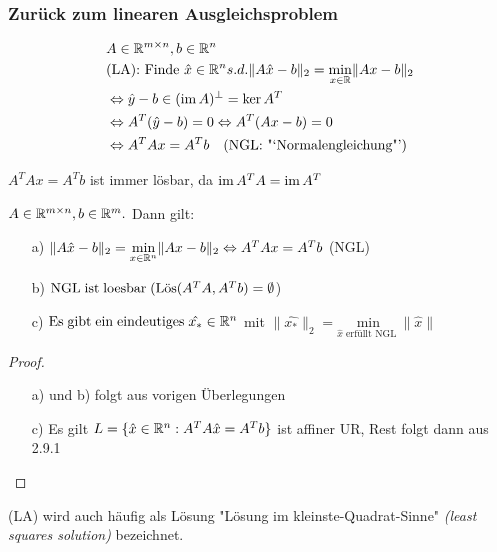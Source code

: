 \subsubsection{Zurück zum linearen Ausgleichsproblem}
\begin{align*}
&A \in \mathbb R^{m \times n}, b \in \mathbb R^n\\
&\text{(LA): Finde } \hat{x} \in \mathbb R^n s.d. \|A\hat{x}-b\|_2 = \underset{x \in \mathbb R}{\mathrm{min}}\|Ax-b\|_2\\
&\Leftrightarrow \hat{y}-b \in (\operatorname*{\mathrm{im}} A)^{\perp} = \ker A^T\\
&\Leftrightarrow A^T(\hat{y}-b)=0 \Leftrightarrow A^T(Ax-b)=0\\
&\Leftrightarrow A^TAx=A^Tb \quad \text{(NGL:  "`Normalengleichung"')}
\end{align*}
\begin{Bemerkung}
$A^TAx=A^Tb$ ist immer lösbar, da $\operatorname*{\mathrm{im}} A^TA=\operatorname*{\mathrm{im}} A^T$
\end{Bemerkung}
\begin{Satz}
$A \in \mathbb R^{m \times n}, b \in \mathbb R^m.$ Dann gilt:
\begin{itemize}
\item[a)]$\|A\hat{x}-b\|_2= \underset{x \in \mathbb R^n}{\mathrm{min}}\|Ax-b\|_2 \Leftrightarrow A^TAx=A^Tb$ (NGL)
\item[b)] $\mathrm{NGL\;ist\;loesbar\;} (\mathrm{L\ddot{o}s}(A^TA,A^Tb) = \emptyset$)
\item[c)] $\mathrm{Es\;gibt\;ein\;eindeutiges\;} \hat{x_{*}} \in \mathbb R^n$ mit $ \|\hat{x_{*}}\|_2 = \underset{\hat{x} \text{ erfüllt NGL }}{\mathrm{min}}\|\hat{x}\|$
\end{itemize}
\end{Satz}
\begin{proof}
	\begin{itemize}
		\item[a) und b)] folgt aus vorigen Überlegungen
		\item[c)] Es gilt $L=\{\hat{x}\in \mathbb R^n:A^TA\hat{x}=A^Tb\}$ ist affiner UR, Rest folgt dann aus 2.9.1
	\end{itemize}
\end{proof}
\begin{Bemerkung}
	(LA) wird auch häufig als Lösung "Lösung im kleinste-Quadrat-Sinne"
	\textit{(least squares solution)} bezeichnet.
\end{Bemerkung}
